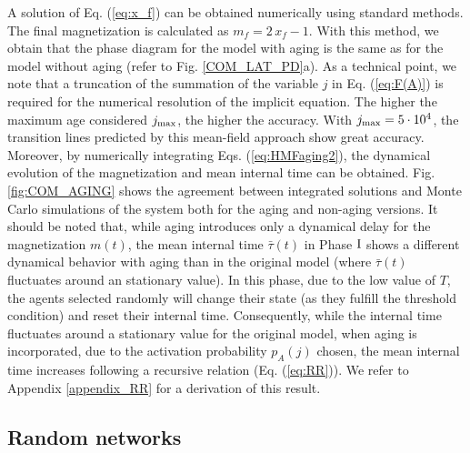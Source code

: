 A solution of Eq. (\ref{eq:x_f}) can be obtained numerically using standard methods. The final magnetization is calculated as $m_f = 2 \,x_f - 1$. With this method, we obtain that the phase diagram for the model with aging is the same as for the model without aging (refer to Fig. \ref{COM_LAT_PD}a). As a technical point, we note that a truncation of the summation of the variable $j$ in Eq. (\ref{eq:F(A)}) is required for the numerical resolution of the implicit equation. The higher the maximum age considered $j_{\rm max}$, the higher the accuracy. With $j_{\rm max} = 5 \cdot 10^4$, the transition lines predicted by this mean-field approach show great accuracy. Moreover, by numerically integrating Eqs. (\ref{eq:HMFaging2}), the dynamical evolution of the magnetization and mean internal time can be obtained. Fig. \ref{fig:COM_AGING} shows the agreement between integrated solutions and Monte Carlo simulations of the system both for the aging and non-aging versions. It should be noted that, while aging introduces only a dynamical delay for the magnetization $m(t)$, the mean internal time $\bar{\tau}(t)$ in Phase ${\rm I}$ shows a different dynamical behavior with aging than in the original model (where $\bar{\tau}(t)$ fluctuates around an stationary value). In this phase, due to the low value of $T$, the agents selected randomly will change their state (as they fulfill the threshold condition) and reset their internal time. Consequently, while the internal time fluctuates around a stationary value for the original model, when aging is incorporated, due to the activation probability $p_A(j)$ chosen, the mean internal time increases following a recursive relation (Eq. (\ref{eq:RR})). We refer to Appendix \ref{appendix_RR} for a derivation of this result.

\subsection{\label{sec:Complex networks aging} Random networks}

